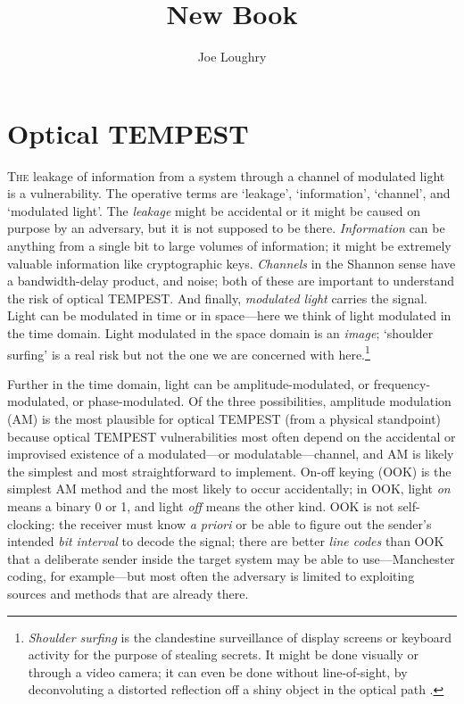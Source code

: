 \documentclass[a4paper,twoside,oldfontcommands]{memoir}
\begin{document}
\title{New Book}
\author{Joe Loughry}
\setcounter{chapter}{6} %
\setcounter{page}{262} %
\thispagestyle{empty}
\chapter{Optical TEMPEST}
\lettrine[lines=3]{T}{he} leakage of information from a system through a
channel of modulated light is a vulnerability. The operative terms are `leakage',
`information', `channel', and `modulated light'. The \emph{leakage} might be
accidental or it might be caused on purpose by an adversary, but it is not
supposed to be there. \emph{Information} can be anything from a single bit to
large volumes of information; it might be extremely valuable information like
cryptographic keys. \emph{Channels} in the Shannon sense \cite{Shannon1948}
have a bandwidth-delay product, and noise; both of these are important to
understand the risk of optical TEMPEST. And finally, \emph{modulated light}
carries the signal. Light can be modulated in time or in space---here we think of
light modulated in the time domain. Light modulated in the space domain is an
\emph{image}; `shoulder surfing' is a real risk but not the one we are
concerned with here.\footnote{\emph{Shoulder surfing} is the clandestine
surveillance of display screens or keyboard activity for the purpose of
stealing secrets. It might be done visually or through a video camera; it can
even be done without line-of-sight, by deconvoluting a distorted reflection off
a shiny object in the optical path
\cite{Backes2008,Backes2009a,Raguram2011,Jenkins2013a,Xu2013a}.}

Further in the time domain, light can be amplitude-modulated, or
frequency-modulated, or phase-modulated. Of the three possibilities, amplitude
modulation (AM) is the most plausible for optical TEMPEST (from a physical
standpoint) because optical TEMPEST vulnerabilities most often depend on the
accidental or improvised existence of a modulated---or modulatable---channel,
and AM is likely the simplest and most straightforward to implement. On-off
keying (OOK) is the simplest AM method and the most likely to occur
accidentally; in OOK, light \emph{on} means a binary 0 or 1, and light
\emph{off} means the other kind. OOK is not self-clocking: the receiver must
know {\it a priori} or be able to figure out the sender's intended \emph{bit
interval} to decode the signal; there are better \emph{line codes} than OOK
that a deliberate sender inside the target system may be able to
use---Manchester coding, for example---but most often the adversary is limited
to exploiting sources and methods that are already there.
\end{document}
